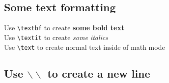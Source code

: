 \documentclass[fleqn, leqno]{article}
\begin{document}
\subsection{Some text formatting}
Use \verb|\textbf| to create \textbf{some bold text}\\
Use \verb|\textit| to create \textit{some italics}\\
Use \verb|\text| to create normal text inside of math mode
\subsection{Use $\backslash \backslash$ to create a new line}
\end{document}
